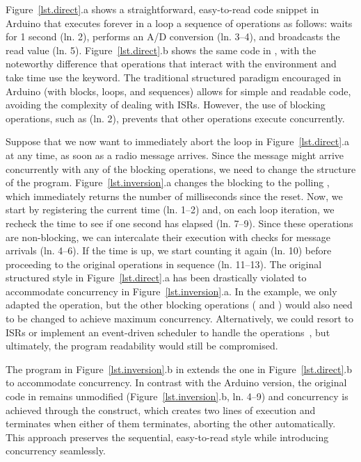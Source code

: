 Figure~\ref{lst.direct}.a shows a straightforward, easy-to-read code snippet
in Arduino that executes forever in a loop a sequence of operations as follows:
    waits for 1 second (ln. 2),
    performs an A/D conversion (ln. 3--4), and
    broadcasts the read value (ln. 5).
%
Figure~\ref{lst.direct}.b shows the same code in \CEU, with the noteworthy
difference that operations that interact with the environment and take time use
the  keyword. %
%
The traditional structured paradigm encouraged in Arduino (with blocks, loops,
and sequences) allows for simple and readable code, avoiding the complexity of
dealing with ISRs.
%
However, the use of blocking operations, such as  (ln. 2),
prevents that other operations execute concurrently.

Suppose that we now want to immediately abort the loop in
Figure~\ref{lst.direct}.a at any time, as soon as a radio message arrives.
%
Since the message might arrive concurrently with any of the blocking
operations, we need to change the structure of the program.
%
Figure~\ref{lst.inversion}.a changes the blocking  to the polling
, which immediately returns the number of milliseconds since the
reset.
Now, we start by registering the current time (ln. 1--2) and, on each loop
iteration, we recheck the time to see if one second has elapsed (ln. 7--9).
Since these operations are non-blocking, we can intercalate their execution
with checks for message arrivals (ln. 4--6).
If the time is up, we start counting it again (ln. 10) before proceeding to the
original operations in sequence (ln. 11--13).
%
The original structured style in Figure~\ref{lst.direct}.a has been drastically
violated to accommodate concurrency in Figure~\ref{lst.inversion}.a.
In the example, we only adapted the  operation, but the other
blocking operations ( and ) would also need
to be changed to achieve maximum concurrency.
%
Alternatively, we could resort to ISRs or implement an event-driven
scheduler to handle the operations~\cite{wsn.nesc}, but ultimately, the
program readability would still be compromised.

The program in Figure~\ref{lst.inversion}.b in \CEU extends the one in
Figure~\ref{lst.direct}.b to accommodate concurrency.
%
In contrast with the Arduino version, the original code in \CEU remains
unmodified (Figure~\ref{lst.inversion}.b, ln. 4--9) and concurrency is achieved
through the  construct, which creates two lines of execution and
terminates when either of them terminates, aborting the other automatically.
%
This approach preserves the sequential, easy-to-read style while introducing
concurrency seamlessly.

